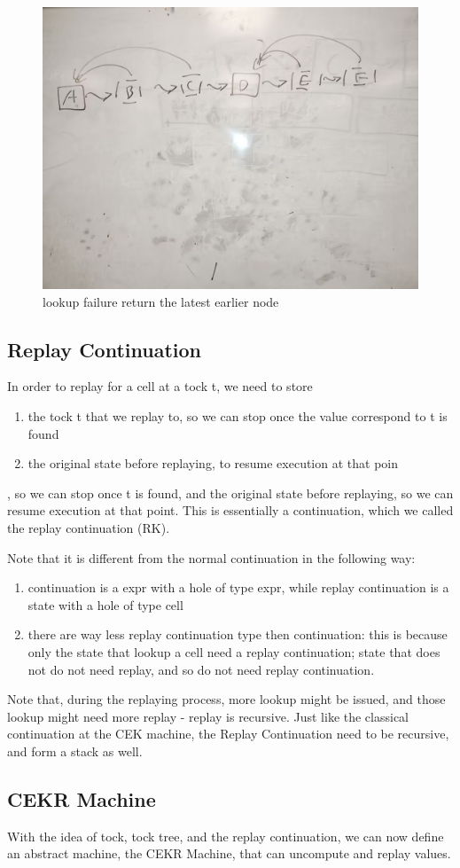 \begin{figure}
	\includegraphics[width=0.5\columnwidth]{4}
	\caption{lookup failure return the latest earlier node}
\end{figure}

\subsection{Replay Continuation}
In order to replay for a cell at a tock t, we need to store
\begin{enumerate}
	\item the tock t that we replay to, so we can stop once the value correspond to t is found
	\item the original state before replaying, to resume execution at that poin
\end{enumerate} , so we can stop once t is found, and the original state before replaying, so we can resume execution at that point. 
This is essentially a continuation, which we called the replay continuation (RK).

Note that it is different from the normal continuation in the following way:
\begin{enumerate}
	\item continuation is a expr with a hole of type expr, while replay continuation is a state with a hole of type cell
	\item there are way less replay continuation type then continuation: this is because only the state that lookup a cell need a replay continuation; state that does not do not need replay, and so do not need replay continuation.
\end{enumerate}

Note that, during the replaying process, more lookup might be issued, and those lookup might need more replay - replay is recursive. Just like the classical continuation at the CEK machine, the Replay Continuation need to be recursive, and form a stack as well.

\subsection{CEKR Machine}
With the idea of tock, tock tree, and the replay continuation, we can now define an abstract machine, the CEKR Machine, that can uncompute and replay values.

